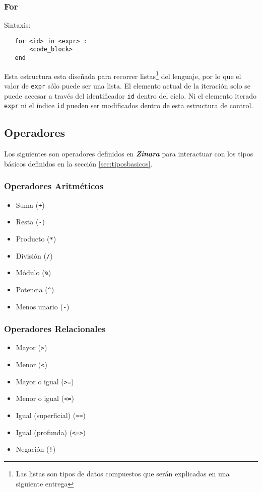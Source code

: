 \documentclass[12pt, spanish]{report}
\begin{document}
\subsubsection{For}
Sintaxis:
\begin{verbatim}
   for <id> in <expr> :
       <code_block>
   end
\end{verbatim}

Esta estructura esta dise\~nada para recorrer listas\footnote{Las
  listas son tipos de datos compuestos que serán explicadas en una
  siguiente entrega} del lenguaje, por lo que el valor de
\texttt{expr} s\'olo puede ser una lista. El elemento actual de la
iteraci\'on solo se puede accesar a trav\'es del identificador
\texttt{id} dentro del ciclo. Ni el elemento iterado \texttt{expr} ni
el \'indice \texttt{id} pueden ser modificados dentro de esta estructura
de control.\\


\subsection{Operadores}
\label{sec:ops}

Los siguientes son operadores definidos en \emph{\textbf{Zinara}} para
interactuar con los tipos básicos definidos en la sección
\ref{sec:tiposbasicos}.

\subsubsection{Operadores Aritm\'eticos}
\begin{itemize}
\item Suma (\texttt{+})
\item Resta    (\texttt{-})
\item Producto (\texttt{*})
\item Divisi\'on  (\texttt{/})
\item M\'odulo (\texttt{\%})
\item Potencia (\texttt{\^})
\item Menos unario (\texttt{-})
\end{itemize}

\subsubsection{Operadores Relacionales}
\begin{itemize}
\item Mayor         (\texttt{>})
\item Menor         (\texttt{<})
\item Mayor o igual (\texttt{>=})
\item Menor o igual (\texttt{<=})
\item Igual (superficial) (\texttt{==})
\item Igual (profunda)    (\texttt{<=>})
\item Negaci\'on      (\texttt{!})
\end{itemize}
\end{document}
